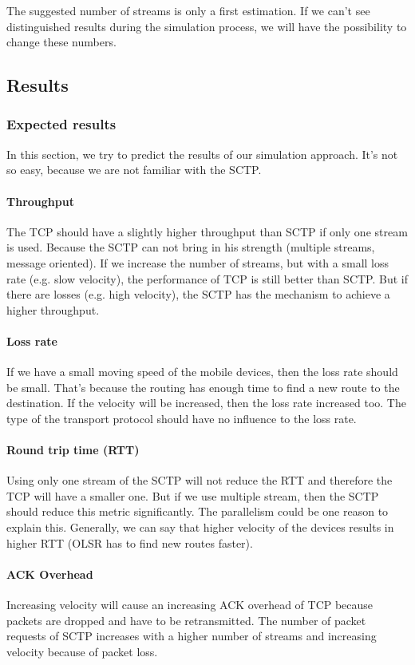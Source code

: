 \documentclass[a4paper]{article}
\begin{document}
The suggested number of streams is only a first estimation. If we can’t see distinguished results during the simulation process, we will have the possibility to change these numbers.
\subsection{Results}
\subsubsection{Expected results}
In this section, we try to predict the results of our simulation approach. It’s not so easy, because we are not familiar with the SCTP.

\paragraph{Throughput}
The TCP should have a slightly higher throughput than SCTP if only one stream is used. Because the SCTP can not bring in his strength (multiple streams, message oriented). If we increase the number of streams, but with a small loss rate (e.g. slow velocity), the performance of TCP is still better than SCTP. But if there are losses (e.g. high velocity), the SCTP has the mechanism to achieve a higher throughput.
\paragraph{Loss rate}
If we have a small moving speed of the mobile devices, then the loss rate should be small. That’s because the routing has enough time to find a new route to the destination. If the velocity will be increased, then the loss rate increased too. The type of the transport protocol should have no influence to the loss rate.
\paragraph{Round trip time (RTT)}
Using only one stream of the SCTP will not reduce the RTT and therefore the TCP will have a smaller one. But if we use multiple stream, then the SCTP should reduce this metric significantly. The parallelism could be one reason to explain this. Generally, we can say that higher velocity of the devices results in higher RTT (OLSR has to find new routes faster).
\paragraph{ACK Overhead}
Increasing velocity will cause an increasing ACK overhead of TCP because packets are dropped and have to be retransmitted. The number of packet requests of SCTP increases with a higher number of streams and increasing velocity because of packet loss.
\end{document}
